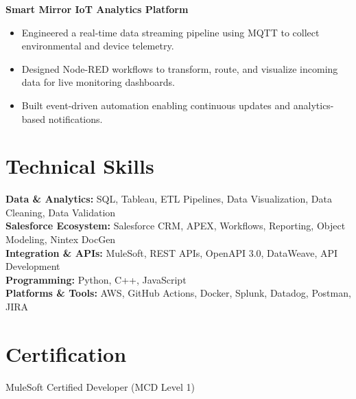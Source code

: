 \documentclass[letterpaper,11pt]{article}
\begin{document}
\textbf{Smart Mirror IoT Analytics Platform}
\begin{itemize}
\item Engineered a real-time data streaming pipeline using MQTT to collect environmental and device telemetry.
\item Designed Node-RED workflows to transform, route, and visualize incoming data for live monitoring dashboards.
\item Built event-driven automation enabling continuous updates and analytics-based notifications.
\end{itemize}



\section*{Technical Skills}

\textbf{Data \& Analytics:} SQL, Tableau, ETL Pipelines, Data Visualization, Data Cleaning, Data Validation
 \\
\textbf{Salesforce Ecosystem:} Salesforce CRM, APEX, Workflows, Reporting, Object Modeling, Nintex DocGen \\
\textbf{Integration \& APIs:} MuleSoft, REST APIs, OpenAPI 3.0, DataWeave, API Development \\
\textbf{Programming:} Python, C++, JavaScript \\
\textbf{Platforms \& Tools:} AWS, GitHub Actions, Docker, Splunk, Datadog, Postman, JIRA

\section*{Certification}

MuleSoft Certified Developer (MCD Level 1)
\end{document}
